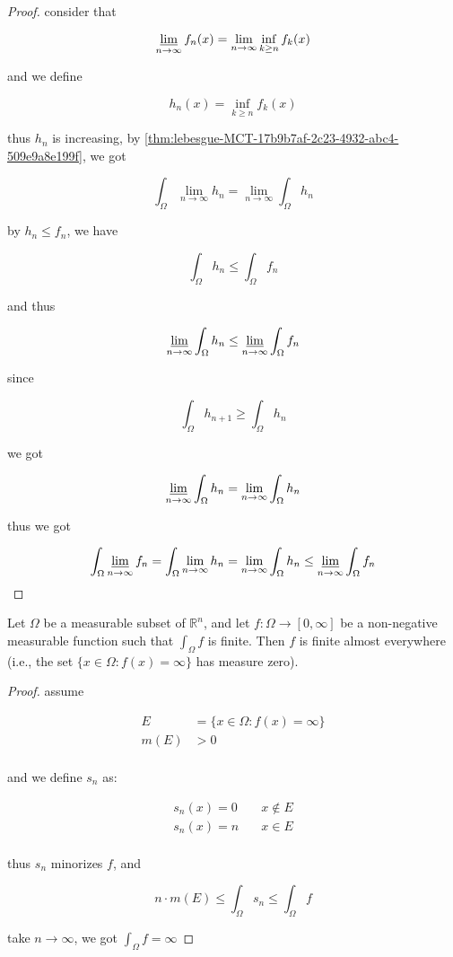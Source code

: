 \begin{proof}
    consider that 

    \[
        \varliminf_{n \to \infty}f_n(x) = \lim_{n \to \infty} \inf_{k \ge n}f_k(x)
    \]

    and we define

    \[
        h_n(x) =\inf_{k \ge n}f_k(x)
    \]

    thus $h_n$ is increasing, by \autoref{thm:lebesgue-MCT-17b9b7af-2c23-4932-abc4-509e9a8e199f}, we got

    \[
        \int_{\Omega} \lim_{n \to \infty}h_n = \lim_{n \to \infty} \int_{\Omega} h_n
    \]

    by $h_n \le f_n$, we have

    \[
        \int_{\Omega} h_n \le \int_{\Omega} f_n
    \]

    and thus

    \[
        \varliminf_{n \to \infty}\int_{\Omega} h_n \le \varliminf_{n \to \infty}\int_{\Omega} f_n
    \]

    since

    \[
\int_{\Omega} h_{n+1} \ge \int_{\Omega} h_{n}
    \]

    we got

    \[
\varliminf_{n \to \infty}\int_{\Omega} h_n = \lim_{n \to \infty}\int_{\Omega} h_n
    \]

    thus we got

    \[
 \int_{\Omega} \varliminf_{n \to \infty} f_n  =       \int_{\Omega} \lim_{n \to \infty}h_n = \lim_{n \to \infty} \int_{\Omega} h_n \le \varliminf_{n \to \infty} \int_{\Omega} f_n
    \]
\end{proof}

\begin{thm}
    Let $\Omega$ be a measurable subset of $\mathbb{R}^n$, and let $f: \Omega \to [0, \infty]$ be a  non-negative measurable function such that $\int_{\Omega}f$ is finite. Then $f$ is finite almost everywhere (i.e., the set $\{x \in \Omega : f(x) = \infty\}$ has measure zero).
\end{thm}

\begin{proof}
    assume 
    
    \begin{align*}
        E &= \{x \in \Omega : f(x) = \infty\} \\
        m(E) & > 0 \\
    \end{align*}

    and we define $s_n$ as:

    \begin{align*}
        s_n(x) = 0 & \quad x \notin E \\
        s_n(x) = n & \quad x \in E \\
    \end{align*}

    thus $s_n$ minorizes $f$, and 
    
    \[
     n \cdot m(E) \le \int_{\Omega}s_n \le \int_{\Omega}f 
    \]

    take $n \to \infty$, we got $\int_{\Omega}f = \infty$
\end{proof}

